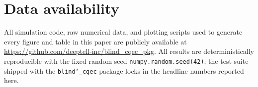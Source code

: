 \documentclass[pra,twocolumn,superscriptaddress,longbibliography,floatfix,nofootinbib]{revtex4-2}
\begin{document}
\section*{Data availability}
All simulation code, raw numerical data, and plotting scripts used to generate every figure and table in this paper are publicly available at \url{https://github.com/deeptell-inc/blind_cqec_pkg}. 
All results are deterministically reproducible with the fixed random seed \texttt{numpy.random.seed(42)}; the test suite shipped with the \texttt{blind\char`\_cqec} package locks in the headline numbers reported here.  
 

  
\end{document}
